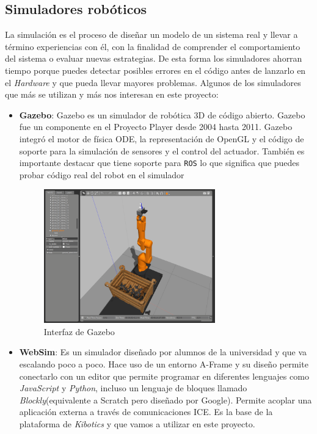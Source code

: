 \subsection{Simuladores robóticos}
\label{sec:simuladores}
La simulación  es el proceso de diseñar un modelo de un sistema real y llevar a término experiencias con él, con la finalidad de comprender el comportamiento del sistema o evaluar nuevas estrategias. De esta forma los simuladores ahorran tiempo porque puedes detectar posibles errores en el código antes de lanzarlo en el \textit{Hardware} y que pueda llevar mayores problemas.\newline
Algunos de los simuladores que más se utilizan y más nos interesan en este proyecto:
\begin{itemize}
    \item \textbf{Gazebo}: Gazebo es un simulador de robótica 3D de código abierto. Gazebo fue un componente en el Proyecto Player desde 2004 hasta 2011. Gazebo integró el motor de física ODE, la representación de OpenGL y el código de soporte para la simulación de sensores y el control del actuador. También es importante destacar que tiene soporte para \texttt{ROS} lo que significa que puedes probar código real del robot en el simulador
    \begin{figure}[H]
    \centering
    \includegraphics[width=0.7\textwidth]{img/gazebo.png}
    \caption{Interfaz de Gazebo} \label{fig:gazebo}
    \end{figure}
    
    \item \textbf{WebSim}: Es un simulador diseñado por alumnos de la universidad y que va escalando poco a poco. Hace uso de un entorno A-Frame y su diseño permite conectarlo con un editor que permite programar en diferentes lenguajes como \textit{JavaScript} y \textit{Python}, incluso un lenguaje de bloques llamado \textit{Blockly}(equivalente a Scratch pero diseñado por Google). Permite acoplar una aplicación externa a través de comunicaciones ICE. Es la base de la plataforma de \textit{Kibotics} y que vamos a utilizar en este proyecto.
\end{itemize}

